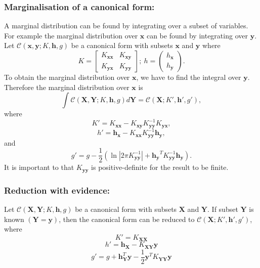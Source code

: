 \documentclass[12pt,oneside,openany,a4paper, %
afrikaans,english,
]{memoir}
\numberwithin{equation}{chapter}
\begin{document}
\subsubsection{Marginalisation of a canonical form:}
A marginal distribution can be found by integrating over a subset of variables. For example the marginal distribution over $\bm{x}$ can be found by integrating over $\bm{y}$. Let $\mathcal{C}(\bm{x},\bm{y};K,\bm{h},g)$ be a canonical form with subsets $\bm{x}$ and $\bm{y}$ where
\begin{equation}
K = 
\begin{bmatrix}
K_{\bm{xx}} & K_{\bm{xy}}\\
K_{\bm{yx}} & K_{\bm{yy}}
\end{bmatrix}
 ;\ h = 
\begin{pmatrix}
h_{\bm{x}} \\
h_{\bm{y}}
\end{pmatrix}.
\end{equation}
To obtain the marginal distribution over $\bm{x}$, we have to find the integral over $\bm{y}$. Therefore the marginal distribution over $\bm{x}$ is
\begin{equation}
\int\mathcal{C}(\bm{X},\bm{Y};K,\bm{h},g)d\bm{Y} = \mathcal{C}(\bm{X};K',\bm{h}',g'),
\end{equation}
 where
\begin{equation}
K' = K_{\bm{xx}} - K_{\bm{xy}}K_{\bm{yy}}^{-1}K_{\bm{yx}},
\end{equation}
\begin{equation}
h' = \bm{h}_{\bm{x}} - K_{\bm{xx}}K_{\bm{yy}}^{-1}\bm{h}_{\bm{y}},
\end{equation}
and
\begin{equation}
g' = g - \frac{1}{2}\left(\ln|2\pi K_{\bm{yy}}^{-1}|+ \bm{h_y}^T K_{\bm{yy}}^{-1}\bm{h_y}\right).
\end{equation}
It is important to that $K_{\bm{yy}}$ is positive-definite for the result to be finite.
\subsubsection{Reduction with evidence:}
Let $\mathcal{C}(\bm{X},\bm{Y};K,\bm{h},g)$ be a canonical form with subsets $\bm{X}$ and $\bm{Y}$. If subset $\bm{Y}$ is known $(\bm{Y} =  \bm{y})$, then the canonical form can be reduced to $\mathcal{C}(\bm{X}; K',\bm{h}',g')$, where
\begin{equation}
K' = K_{\bm{XX}}
\end{equation}
\begin{equation}
h' = \bm{h}_{\bm{X}} - K_{\bm{XY}}\bm{y}
\end{equation}
\begin{equation}
g' = g + \bm{h}_{\bm{Y}}^T\bm{y} - \frac{1}{2}\bm{y}^TK_{\bm{YY}}\bm{y}
\end{equation}
\end{document}
